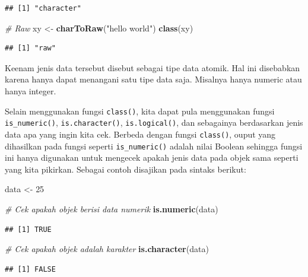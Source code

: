 \documentclass[]{book}
\newenvironment{Shaded}{\begin{snugshade}}{\end{snugshade}}
\newcommand{\KeywordTok}[1]{\textcolor[rgb]{0.13,0.29,0.53}{\textbf{#1}}}
\newcommand{\DecValTok}[1]{\textcolor[rgb]{0.00,0.00,0.81}{#1}}
\newcommand{\StringTok}[1]{\textcolor[rgb]{0.31,0.60,0.02}{#1}}
\newcommand{\CommentTok}[1]{\textcolor[rgb]{0.56,0.35,0.01}{\textit{#1}}}
\newcommand{\NormalTok}[1]{#1}
\begin{document}
\begin{verbatim}
## [1] "character"
\end{verbatim}

\begin{Shaded}
\begin{Highlighting}[]
\CommentTok{# Raw}
\NormalTok{xy <-}\StringTok{ }\KeywordTok{charToRaw}\NormalTok{(}\StringTok{"hello world"}\NormalTok{)}
\KeywordTok{class}\NormalTok{(xy)}
\end{Highlighting}
\end{Shaded}

\begin{verbatim}
## [1] "raw"
\end{verbatim}

Keenam jenis data tersebut disebut sebagai tipe data atomik. Hal ini
disebabkan karena hanya dapat menangani satu tipe data saja. Misalnya
hanya numeric atau hanya integer.

Selain menggunakan fungsi \texttt{class()}, kita dapat pula menggunakan
fungsi \texttt{is\_numeric()}, \texttt{is.character()},
\texttt{is.logical()}, dan sebagainya berdasarkan jenis data apa yang
ingin kita cek. Berbeda dengan fungsi \texttt{class()}, ouput yang
dihasilkan pada fungsi seperti \texttt{is\_numeric()} adalah nilai
Boolean sehingga fungsi ini hanya digunakan untuk mengecek apakah jenis
data pada objek sama seperti yang kita pikirkan. Sebagai contoh
disajikan pada sintaks berikut:

\begin{Shaded}
\begin{Highlighting}[]
\NormalTok{data <-}\StringTok{ }\DecValTok{25}

\CommentTok{# Cek apakah objek berisi data numerik}
\KeywordTok{is.numeric}\NormalTok{(data)}
\end{Highlighting}
\end{Shaded}

\begin{verbatim}
## [1] TRUE
\end{verbatim}

\begin{Shaded}
\begin{Highlighting}[]
\CommentTok{# Cek apakah objek adalah karakter}
\KeywordTok{is.character}\NormalTok{(data)}
\end{Highlighting}
\end{Shaded}

\begin{verbatim}
## [1] FALSE
\end{verbatim}
\end{document}
